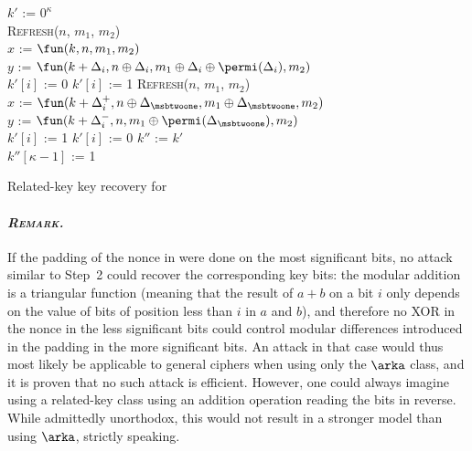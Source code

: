 \begin{algorithm}[h]
\LinesNumbered
{}

$k'$ := $0^\kappa$\\
{
	\textsc{Refresh}($n$, $m_1$, $m_2$)\\
	$x$ := $\fun(k, n, m_1, m_2)$\\
	$y$ := $\fun(k + \Delta_i, n \oplus \Delta_i,
                 m_1 \oplus \Delta_i \oplus \permi(\Delta_i), m_2)$\\
	{
		$k'[i]$ := 0	
	}
	\Else
	{
		$k'[i]$ := 1
	}
}
{
	\textsc{Refresh}($n$, $m_1$, $m_2$)\\
	$x$ := $\fun(k + \Delta_i^+, n \oplus \Delta_{\msbtwoone}, m_1 \oplus \Delta_{\msbtwoone}, m_2)$\\
	$y$ := $\fun(k + \Delta_i^-, n, m_1 \oplus \permi(\Delta_{\msbtwoone}), m_2)$\\
	{
		$k'[i]$ := 1	
	}
	\Else
	{
		$k'[i]$ := 0
	}
}
$k''$ := $k'$\\
$k''[\kappa - 1]$ := 1\\
\caption{Related-key key recovery for \proestotr\label{alg:kr}}
\end{algorithm}


\paragraph{\emph{\textsc{Remark.}}} If the padding of the nonce in \proestotr were done on the most significant bits, no attack similar
to Step~2 could recover
the corresponding key bits: the modular addition is a triangular function (meaning that the result of $a + b$ on a bit $i$ only
depends on the value of bits of position less than $i$ in $a$ and $b$), and therefore no XOR in the nonce in the less
significant bits could control modular differences introduced in the padding in the more significant bits. An attack in that case would thus most likely
be applicable to general ciphers when using only the $\arka$ class, and it is proven that no such attack is efficient.
However, one could always imagine using a related-key class using an addition operation reading the bits in reverse. While
admittedly unorthodox, this would not result in a stronger model than using $\arka$, strictly speaking.

